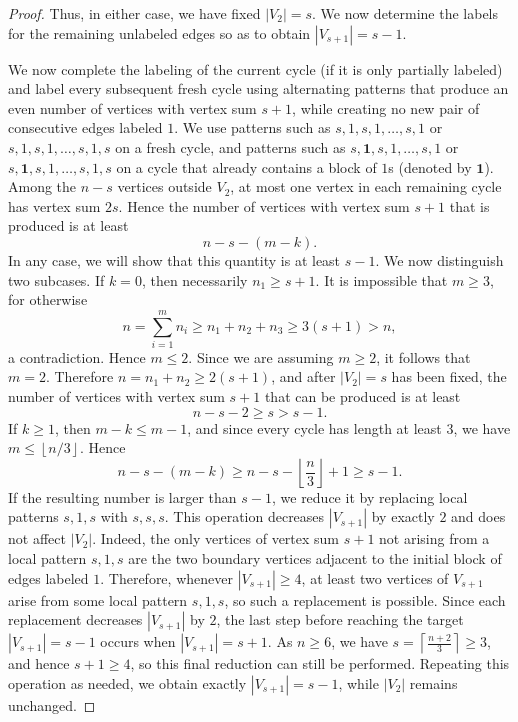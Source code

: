 \documentclass[11pt]{article}
\numberwithin{equation}{section}
\begin{document}
\begin{proof}
\smallskip
\noindent
Thus, in either case, we have fixed $|V_2|=s$. We now determine the labels for the remaining unlabeled edges so as to obtain $|V_{s+1}| = s-1$.

We now complete the labeling of the current cycle (if it is only partially labeled) and label every subsequent fresh cycle using alternating patterns that produce an even number of vertices with vertex sum $s+1$, while creating no new pair of consecutive edges labeled $1$. We use patterns such as $s,1,s,1,\ldots,s,1$ or $s,1,s,1,\ldots,s,1,s$ on a fresh cycle, and patterns such as $s,\mathbf{1},s,1,\ldots,s,1$ or $s,\mathbf{1},s,1,\ldots,s,1,s$ on a cycle that already contains a block of $1$s (denoted by $\mathbf{1}$). Among the \(n-s\) vertices outside \(V_2\), at most one vertex in each remaining cycle has vertex sum \(2s\). Hence the number of vertices with vertex sum \(s+1\) that is produced is at least
\[
n-s-(m-k).
\]
In any case, we will show that this quantity is at least \(s-1\). We now distinguish two subcases. If \(k=0\), then necessarily \(n_1\ge s+1\). It is impossible that \(m\ge 3\), for otherwise
\[
n=\sum_{i=1}^m n_i \ge n_1+n_2+n_3 \ge 3(s+1)>n,
\]
a contradiction. Hence \(m\le 2\). Since we are assuming \(m\ge 2\), it follows that \(m=2\). Therefore \(n=n_1+n_2\ge 2(s+1)\), and after \(|V_2|=s\) has been fixed, the number of vertices with vertex sum \(s+1\) that can be produced is at least
\[
n-s-2\ge s>s-1.
\]
If \(k\ge 1\), then \(m-k\le m-1\), and since every cycle has length at least \(3\), we have \(m\le \left\lfloor n/3 \right\rfloor\). Hence
\[
n-s-(m-k)\ge n-s-\left\lfloor \frac n3 \right\rfloor +1 \ge s-1.
\]
If the resulting number is larger than \(s-1\), we reduce it by replacing local patterns \(s,1,s\) with \(s,s,s\). This operation decreases \(|V_{s+1}|\) by exactly \(2\) and does not affect \(|V_2|\). Indeed, the only vertices of vertex sum \(s+1\) not arising from a local pattern \(s,1,s\) are the two boundary vertices adjacent to the initial block of edges labeled \(1\). Therefore, whenever \(|V_{s+1}|\ge 4\), at least two vertices of \(V_{s+1}\) arise from some local pattern \(s,1,s\), so such a replacement is possible. Since each replacement decreases \(|V_{s+1}|\) by \(2\), the last step before reaching the target \(|V_{s+1}|=s-1\) occurs when \(|V_{s+1}|=s+1\). As \(n\ge 6\), we have \(s=\left\lceil\frac{n+2}{3}\right\rceil\ge 3\), and hence \(s+1\ge 4\), so this final reduction can still be performed. Repeating this operation as needed, we obtain exactly \(|V_{s+1}|=s-1\), while \(|V_2|\) remains unchanged.


\end{proof}
\end{document}
